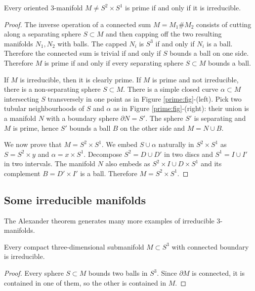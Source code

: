 \begin{prop} \label{S2S1:prop}
Every oriented 3-manifold $M\neq S^2 \times S^1$ is prime if and only if it is irreducible.
\end{prop}
\begin{proof}
The inverse operation of a connected sum $M=M_1\# M_2$ consists of cutting along a separating sphere $S\subset M$ and then capping off the two resulting manifolds $N_1, N_2$ with balls. The capped $N_i$ is $S^3$ if and only if $N_i$ is a ball. Therefore the connected sum is trivial if and only if $S$ bounds a ball on one side. Therefore $M$ is prime if and only if every separating sphere $S\subset M$ bounds a ball.

If $M$ is irreducible, then it is clearly prime. If $M$ is prime and not irreducible, there is a non-separating sphere $S\subset M$. There is a simple closed curve $\alpha\subset M$ intersecting $S$ transversely in one point as in Figure \ref{prime:fig}-(left). Pick two tubular neighbourhoods of $S$ and $\alpha$ as in Figure \ref{prime:fig}-(right): their union is a manifold $N$ with a boundary sphere $\partial N = S'$. The sphere $S'$ is separating and $M$ is prime, hence $S'$ bounds a ball $B$ on the other side and $M=N\cup B$. 

We now prove that $M=S^2\times S^1$. We embed $S\cup \alpha$ naturally in $S^2\times S^1$ as $S = S^2\times y$ and $\alpha = x \times S^1$. Decompose $S^2= D\cup D'$ in two discs and $S^1 = I\cup I'$ in two intervals. The manifold
$N$ also embeds as $S^2\times I \cup D \times S^1$ and its complement $B=D'\times I'$ is a ball. Therefore $M = S^2\times S^1$.
\end{proof}

\subsection{Some irreducible manifolds}
The Alexander theorem generates many more examples of irreducible 3-manifolds.

\begin{prop} \label{connected:boundary:prop}
Every compact three-dimensional submanifold $M\subset S^3$ with connected boundary is irreducible.
\end{prop}
\begin{proof}
Every sphere $S \subset M$ bounds two balls in $S^3$. Since $\partial M$ is connected, it is contained in one of them, so the other is contained in $M$.
\end{proof}

